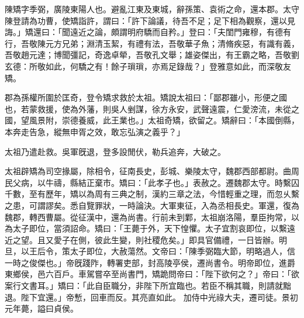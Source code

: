 \begin{pinyinscope}
 
 
 陳矯字季弼，廣陵東陽人也。避亂江東及東城，辭孫策、袁術之命，還本郡。太守陳登請為功曹，使矯詣許，謂曰：「許下論議，待吾不足；足下相為觀察，還以見誨。」矯還曰：「聞遠近之論，頗謂明府驕而自矜。」登曰：「夫閨門雍穆，有德有行，吾敬陳元方兄弟；淵清玉絜，有禮有法，吾敬華子魚；清脩疾惡，有識有義，吾敬趙元達；博聞彊記，奇逸卓犖，吾敬孔文舉；雄姿傑出，有王霸之略，吾敬劉玄德：所敬如此，何驕之有！餘子瑣瑣，亦焉足錄哉？」登雅意如此，而深敬友矯。
 
 
 
 
 郡為孫權所圍於匡奇，登令矯求救於太祖。矯說太祖曰：「鄙郡雖小，形便之國也，若蒙救援，使為外藩，則吳人剉謀，徐方永安，武聲遠震，仁愛滂流，未從之國，望風景附，崇德養威，此王業也。」太祖奇矯，欲留之。矯辭曰：「本國倒縣，本奔走告急，縱無申胥之效，敢忘弘演之義乎？」
 
 
 太祖乃遣赴救。吳軍旣退，登多設閒伏，勒兵追奔，大破之。
 
 
太祖辟矯為司空掾屬，除相令，征南長史，彭城、樂陵太守，魏郡西部都尉。曲周民父病，以牛禱，縣結正棄市。矯曰：「此孝子也。」表赦之。遷魏郡太守。時繫囚千數，至有歷年，矯以為周有三典之制，漢約三章之法，今惜輕重之理，而忽乆繫之患，可謂謬矣。悉自覽罪狀，一時論決。大軍東征，入為丞相長史。軍還，復為魏郡，轉西曹屬。從征漢中，還為尚書。行前未到鄴，太祖崩洛陽，羣臣拘常，以為太子即位，當須詔命。矯曰：「王薨于外，天下惶懼。太子宜割哀即位，以繫遠近之望。且又愛子在側，彼此生變，則社稷危矣。」即具官備禮，一日皆辦。明旦，以王后令，策太子即位，大赦蕩然。文帝曰：「陳季弼臨大節，明略過人，信一時之俊傑也。」帝旣踐阼，轉署吏部，封高陵亭侯，遷尚書令。明帝即位，進爵東鄉侯，邑六百戶。車駕嘗卒至尚書門，矯跪問帝曰：「陛下欲何之？」帝曰：「欲案行文書耳。」矯曰：「此自臣職分，非陛下所宜臨也。若臣不稱其職，則請就黜退。陛下宜還。」帝慙，回車而反。其亮直如此。
 加侍中光祿大夫，遷司徒。景初元年薨，謚曰貞侯。
 

\end{pinyinscope}

